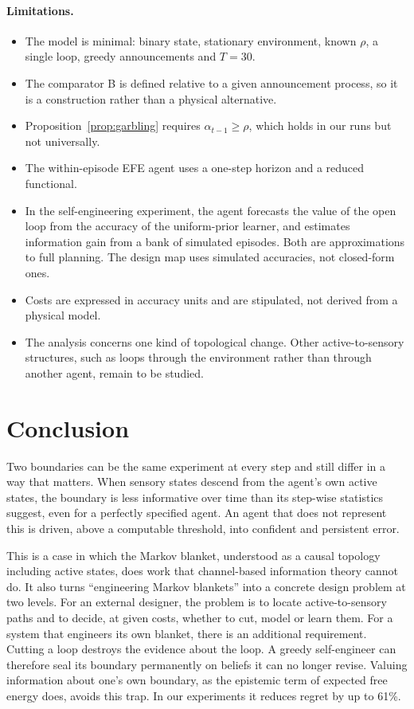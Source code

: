 \documentclass[11pt]{article}
\theoremstyle{definition}
\theoremstyle{remark}
\begin{document}
\paragraph{Limitations.}
\begin{itemize}
\item The model is minimal: binary state, stationary environment, known $\rho$,
      a single loop, greedy announcements and $T=30$.
\item The comparator B is defined relative to a given announcement process, so
      it is a construction rather than a physical alternative.
\item Proposition~\ref{prop:garbling} requires $\alpha_{t-1}\ge\rho$, which
      holds in our runs but not universally.
\item The within-episode EFE agent uses a one-step horizon and a reduced
      functional.
\item In the self-engineering experiment, the agent forecasts the value of the
      open loop from the accuracy of the uniform-prior learner, and estimates
      information gain from a bank of simulated episodes. Both are
      approximations to full planning. The design map uses simulated
      accuracies, not closed-form ones.
\item Costs are expressed in accuracy units and are stipulated, not derived
      from a physical model.
\item The analysis concerns one kind of topological change. Other
      active-to-sensory structures, such as loops through the environment rather
      than through another agent, remain to be studied.
\end{itemize}

\section{Conclusion}

Two boundaries can be the same experiment at every step and still differ in a
way that matters. When sensory states descend from the agent's own active
states, the boundary is less informative over time than its step-wise statistics
suggest, even for a perfectly specified agent. An agent that does not represent
this is driven, above a computable threshold, into confident and persistent
error.

This is a case in which the Markov blanket, understood as a causal topology
including active states, does work that channel-based information theory cannot
do. It also turns ``engineering Markov blankets'' into a concrete design problem
at two levels. For an external designer, the problem is to locate
active-to-sensory paths and to decide, at given costs, whether to cut, model or
learn them. For a system that engineers its own blanket, there is an additional
requirement. Cutting a loop destroys the evidence about the loop. A greedy
self-engineer can therefore seal its boundary permanently on beliefs it can no
longer revise. Valuing information about one's own boundary, as the epistemic
term of expected free energy does, avoids this trap. In our experiments it
reduces regret by up to 61\%.
\end{document}
